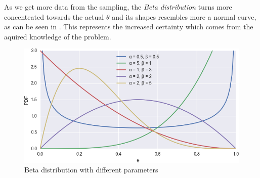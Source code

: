 As we get more data from the sampling, the \emph{Beta distribution} turns more concenteated towards the actual \( \theta \) and its shapes resembles more a normal curve, as can be seen in . This represents the increased certainty which comes from the aquired knowledge of the problem.

\begin{figure}[H]
\begin{center}
\includegraphics[width=\textwidth]{figures/beta.png}
\caption{Beta distribution with different parameters}
\end{center}
\label{betagraph}
\end{figure}
